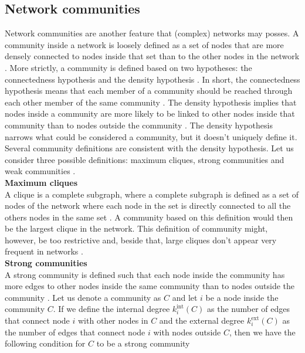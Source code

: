 \documentclass[11 pt , letterpaper , twoside , openright]{book}
\begin{document}
\subsection{Network communities}

Network communities are another feature that (complex) networks may posses. A community inside a network is loosely defined as a set of nodes that are more densely connected to nodes inside that set than to the other nodes in the network \cite{Saha2015}. More strictly, a community is defined based on two hypotheses: the connectedness hypothesis and the density hypothesis \cite{Albert2016}. In short, the connectedness hypothesis means that each member of a community should be reached through each other member of the same community \cite{Albert2016}. The density hypothesis implies that nodes inside a community are more likely to be linked to other nodes inside that community than to nodes outside the community \cite{Albert2016}. The density hypothesis narrows what could be considered a community, but it doesn't uniquely define it. Several community definitions are consistent with the density hypothesis. Let us consider three possible definitions: maximum cliques, strong communities and weak communities \cite{Albert2016}.\\
\newline
\textbf{Maximum cliques}\\
\newline
A clique is a complete subgraph, where a complete subgraph is defined as a set of nodes of the network where each node in the set is directly connected to all the others nodes in the same set \cite{Albert2016}. A community based on this definition would then be the largest clique in the network. This definition of community might, however, be too restrictive and, beside that, large cliques don't appear very frequent in networks \cite{Albert2016}.\\   
\newpage
\noindent
\textbf{Strong communities}\\
\newline
A strong community is defined such that each node inside the community has more edges to other nodes inside the same community than to nodes outside the community \cite{Albert2016}\cite{F.Costa2007}. Let us denote a community as $C$ and let $i$ be a node inside the community $C$. If we define the internal degree $k_i^{\textrm{int}}(C)$ as the number of edges that connect node $i$ with other nodes in $C$ and the external degree $k_i^{\textrm{ext}}(C)$ as the number of edges that connect node $i$ with nodes outside $C$, then we have the following condition for $C$ to be a strong community \cite{Albert2016}
\end{document}
